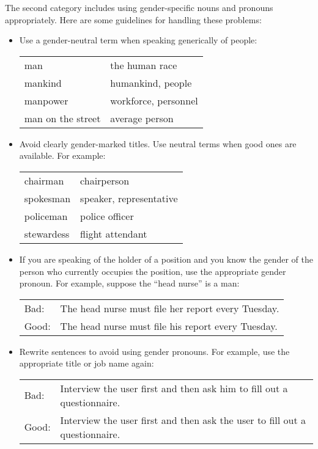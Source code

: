 The second category includes using gender-specific nouns and pronouns
appropriately. Here are some guidelines for handling these
problems:
\begin{itemize}

\item Use a gender-neutral term when speaking generically of people:

\begin{tabular}{ll}
   man                 &   the human race        \\
   mankind             &   humankind, people     \\
   manpower            &   workforce, personnel  \\
   man on the street   &   average person        \\
\end{tabular}


\item Avoid clearly gender-marked titles. Use neutral terms when
good ones are available. For example:

\begin{tabular}{ll}
  chairman     &  chairperson               \\
  spokesman    &  speaker, representative   \\
  policeman    &  police officer            \\
  stewardess   &  flight attendant          \\
\end{tabular}



\item If you are speaking of the holder of a position and you know the
  gender of the person who currently occupies the position, use the
  appropriate gender pronoun.  For example, suppose the ``head nurse''
  is a man:

\begin{tabular}{lp{0.9\hsize}}
Bad:  & The head nurse must file her report every Tuesday. \\
Good: & The head nurse must file his report every Tuesday. \\
\end{tabular}



\item Rewrite sentences to avoid using gender pronouns. For example,
  use the appropriate title or job name again:

\begin{tabular}{lp{0.9\hsize}}
Bad: &
Interview the user first and then ask him to fill out a questionnaire. \\
%
Good: &
Interview the user first and then ask the user to fill out a questionnaire. \\
\end{tabular}




\end{itemize}
